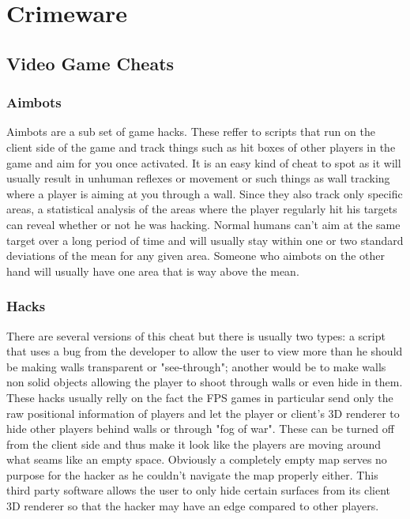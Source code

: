 \documentclass[sigconf]{acmart}
\begin{document}
\section{Crimeware}

\subsection{Video Game Cheats}

\subsubsection{Aimbots}
Aimbots are a sub set of game hacks. These reffer to scripts that run on the client side of the game 
and track things such as hit boxes of other players in the game and aim for you once activated. It is 
an easy kind of cheat to spot as it will usually result in unhuman reflexes or movement or such things 
as wall tracking where a player is aiming at you through a wall. Since they also track only specific 
areas, a statistical analysis of the areas where the player regularly hit his targets can reveal whether 
or not he was hacking. Normal humans can't aim at the same target over a long period of time and will
usually stay within one or two standard deviations of the mean for any given area. Someone who aimbots 
on the other hand will usually have one area that is way above the mean.

\subsubsection{Hacks}
There are several versions of this cheat but there is usually two types: a script that uses a bug from the
developer to allow the user to view more than he should be making walls transparent or "see-through"; 
another would be to make walls non solid objects allowing the player to shoot through walls or 
even hide in them. These hacks usually relly on the fact the FPS games in particular send 
only the raw positional information of players and let the player or client's 3D renderer to 
hide other players behind walls or through "fog of war". These can be turned off from the client 
side and thus make it look like the players are moving around what seams like an empty space. 
Obviously a completely empty map serves no purpose for the hacker as he couldn't navigate the map properly 
either. This third party software allows the user to only hide certain surfaces from its client 3D 
renderer so that the hacker may have an edge compared to other players.
\end{document}
